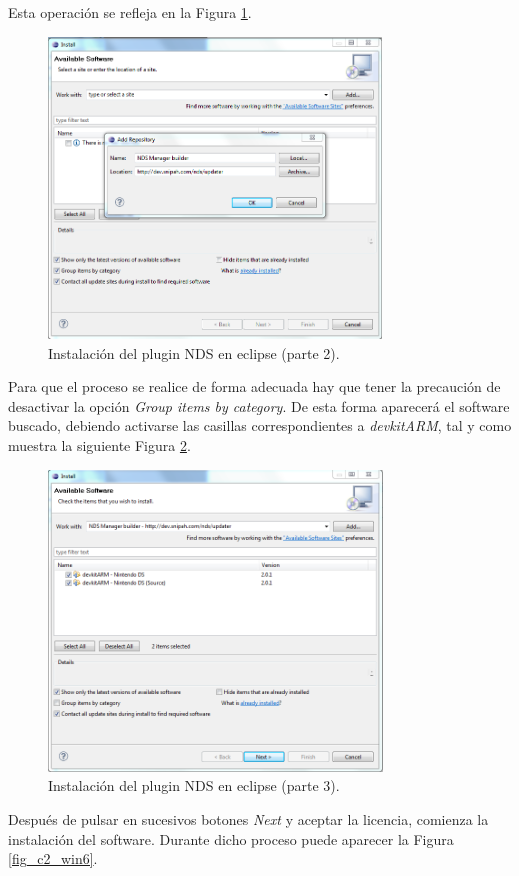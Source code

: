 Esta operación se refleja en la Figura \ref{fig_c2_win2}.

\begin{figure}[t]
\centering
\includegraphics[height=8cm]{./Figuras/C2/c2_instalar_windows2.png}
\caption{Instalación del plugin NDS en eclipse (parte 2).}
\label{fig_c2_win2}
\end{figure}

Para que el proceso se realice de forma adecuada hay que tener la precaución de desactivar la opción \textit{Group items by category}. De esta forma aparecerá el software buscado, debiendo activarse las casillas correspondientes a \textit{devkitARM}, tal y como muestra la siguiente Figura \ref{fig_c2_win4}.

\begin{figure}[t]
\centering
\includegraphics[height=8cm]{./Figuras/C2/c2_instalar_windows4.png}
\caption{Instalación del plugin NDS en eclipse (parte 3).}
\label{fig_c2_win4}
\end{figure}

Después de pulsar en sucesivos botones \textit{Next} y aceptar la licencia, comienza la instalación  del software. Durante dicho proceso puede aparecer la Figura \ref{fig_c2_win6}.

